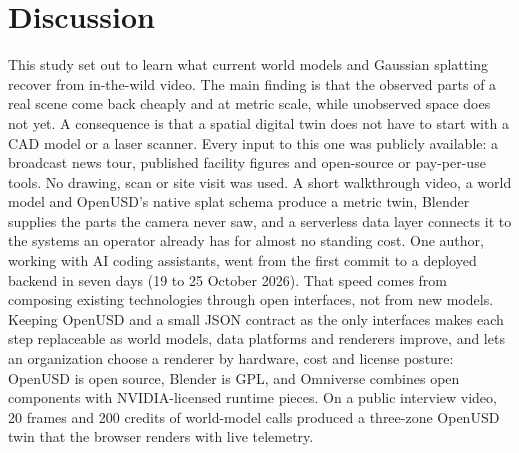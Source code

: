 \documentclass{article}
\begin{document}
\section{Discussion}
This study set out to learn what current world models and Gaussian splatting
recover from in-the-wild video. The main finding is that the observed parts of
a real scene come back cheaply and at metric scale, while unobserved space does
not yet. A consequence is that a spatial digital twin does not have to start
with a CAD model or a laser scanner. Every input to this one was publicly available: a broadcast news
tour, published facility figures and open-source or pay-per-use tools. No
drawing, scan or site visit was used. A short walkthrough video, a world model
and OpenUSD's native splat schema produce a metric twin, Blender supplies the parts the camera never saw, and a serverless data
layer connects it to the systems an operator already has for almost no
standing cost. One author, working with AI coding assistants, went from the
first commit to a deployed backend in seven days (19 to 25 October 2026). That
speed comes from composing existing technologies through open interfaces,
not from new models. Keeping OpenUSD and a small JSON contract as the only interfaces makes
each step replaceable as world models, data platforms and renderers improve,
and lets an organization choose a renderer by hardware, cost and license
posture: OpenUSD is open source, Blender is GPL, and Omniverse combines open
components with NVIDIA-licensed runtime pieces. On a public interview video, 20 frames and
200 credits of world-model calls produced a three-zone OpenUSD twin that the
browser renders with live telemetry.
\end{document}
